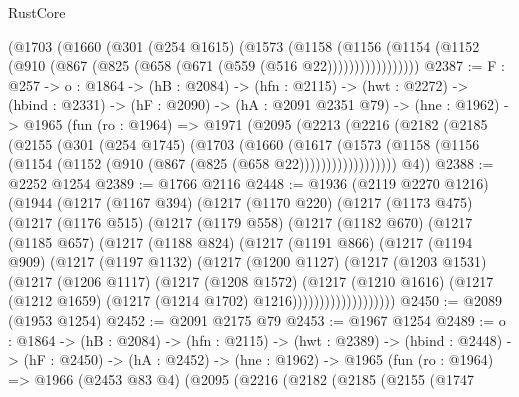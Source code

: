 \begin{lexlean}{RustCore}
\begin{coremodule}
        (@1703
          (@1660
            (@301
              (@254 @1615)
              (@1573
                (@1158
                  (@1156
                    (@1154 (@1152 (@910 (@867 (@825 (@658 (@671 (@559 (@516 @22)))))))))))))))))
@2387 := {F : @257} ->
  {o : @1864} ->
  (hB : @2084) ->
  (hfn : @2115) ->
  (hwt : @2272) ->
  (hbind : @2331) ->
  (hF : @2090) ->
  (hA : @2091 @2351 @79) ->
  (hne : @1962) ->
  @1965
    (fun (ro : @1964) =>
    @1971
      (@2095
        (@2213
          (@2216
            (@2182
              (@2185
                (@2155
                  (@301
                    (@254 @1745)
                    (@1703
                      (@1660
                        (@1617
                          (@1573
                            (@1158
                              (@1156 (@1154 (@1152 (@910 (@867 (@825 (@658 @22))))))))))))))))))
        @4))
@2388 := @2252 @1254
@2389 := @1766 @2116
@2448 := @1936
    (@2119 @2270 @1216)
    (@1944
      (@1217
        (@1167 @394)
        (@1217
          (@1170 @220)
          (@1217
            (@1173 @475)
            (@1217
              (@1176 @515)
              (@1217
                (@1179 @558)
                (@1217
                  (@1182 @670)
                  (@1217
                    (@1185 @657)
                    (@1217
                      (@1188 @824)
                      (@1217
                        (@1191 @866)
                        (@1217
                          (@1194 @909)
                          (@1217
                            (@1197 @1132)
                            (@1217
                              (@1200 @1127)
                              (@1217
                                (@1203 @1531)
                                (@1217
                                  (@1206 @1117)
                                  (@1217
                                    (@1208 @1572)
                                    (@1217
                                      (@1210 @1616)
                                      (@1217
                                        (@1212 @1659)
                                        (@1217 (@1214 @1702) @1216)))))))))))))))))))
@2450 := @2089 (@1953 @1254)
@2452 := @2091 @2175 @79
@2453 := @1967 @1254
@2489 := {o : @1864} ->
  (hB : @2084) ->
  (hfn : @2115) ->
  (hwt : @2389) ->
  (hbind : @2448) ->
  (hF : @2450) ->
  (hA : @2452) ->
  (hne : @1962) ->
  @1965
    (fun (ro : @1964) =>
    @1966
      (@2453 @83 @4)
      (@2095
        (@2216
          (@2182
            (@2185
              (@2155
                (@1747

\end{coremodule}
\end{lexlean}
